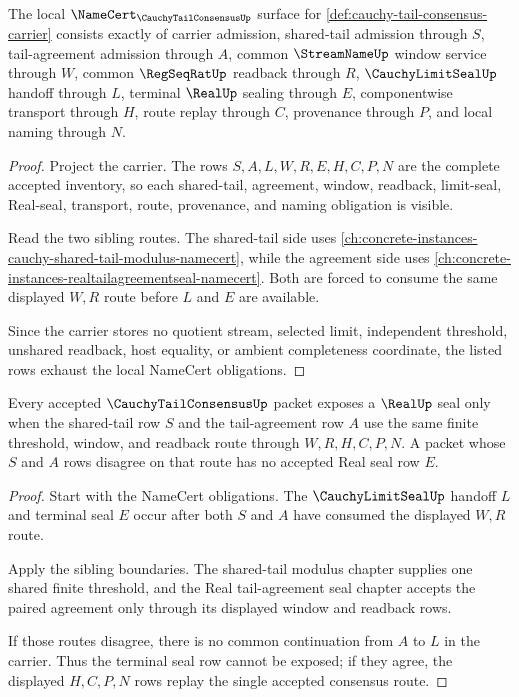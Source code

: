 \begin{theorem}
\label{thm:cauchy-tail-consensus-namecert-obligations}
The local $\NameCert_{\CauchyTailConsensusUp}$ surface for \autoref{def:cauchy-tail-consensus-carrier} consists exactly of carrier admission, shared-tail admission through $S$, tail-agreement admission through $A$, common $\StreamNameUp$ window service through $W$, common $\RegSeqRatUp$ readback through $R$, $\CauchyLimitSealUp$ handoff through $L$, terminal $\RealUp$ sealing through $E$, componentwise transport through $H$, route replay through $C$, provenance through $P$, and local naming through $N$.
\end{theorem}
\begin{proof}
Project the carrier. The rows $S,A,L,W,R,E,H,C,P,N$ are the complete accepted inventory, so each shared-tail, agreement, window, readback, limit-seal, Real-seal, transport, route, provenance, and naming obligation is visible.

Read the two sibling routes. The shared-tail side uses \autoref{ch:concrete-instances-cauchy-shared-tail-modulus-namecert}, while the agreement side uses \autoref{ch:concrete-instances-realtailagreementseal-namecert}. Both are forced to consume the same displayed $W,R$ route before $L$ and $E$ are available.

Since the carrier stores no quotient stream, selected limit, independent threshold, unshared readback, host equality, or ambient completeness coordinate, the listed rows exhaust the local NameCert obligations.
\end{proof}

\begin{theorem}
\label{thm:cauchy-tail-consensus-shared-route-determinacy}
Every accepted $\CauchyTailConsensusUp$ packet exposes a $\RealUp$ seal only when the shared-tail row $S$ and the tail-agreement row $A$ use the same finite threshold, window, and readback route through $W,R,H,C,P,N$. A packet whose $S$ and $A$ rows disagree on that route has no accepted Real seal row $E$.
\end{theorem}
\begin{proof}
Start with the NameCert obligations. The $\CauchyLimitSealUp$ handoff $L$ and terminal seal $E$ occur after both $S$ and $A$ have consumed the displayed $W,R$ route.

Apply the sibling boundaries. The shared-tail modulus chapter supplies one shared finite threshold, and the Real tail-agreement seal chapter accepts the paired agreement only through its displayed window and readback rows.

If those routes disagree, there is no common continuation from $A$ to $L$ in the carrier. Thus the terminal seal row cannot be exposed; if they agree, the displayed $H,C,P,N$ rows replay the single accepted consensus route.
\end{proof}

